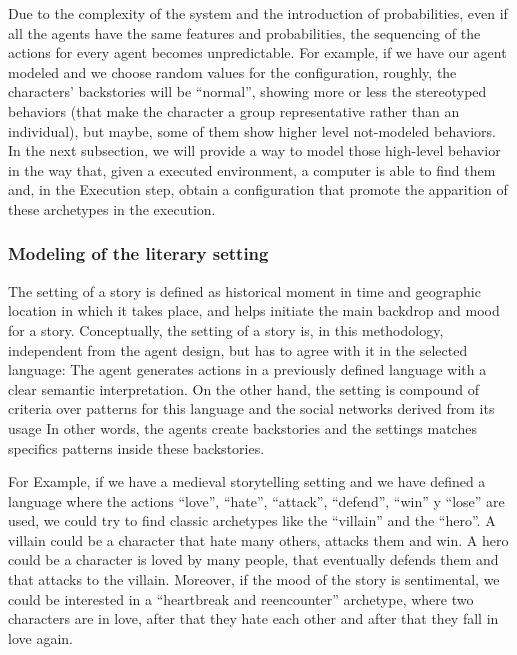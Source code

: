 \documentclass{sig-alternate}
\begin{document}
Due to the complexity of the system and the introduction of probabilities, even if all the agents have the same features and probabilities, the sequencing of the actions for every agent becomes unpredictable. For example, if we have our agent modeled and we choose random values for the configuration, roughly, the characters' backstories will be ``normal'', showing more or less the stereotyped behaviors (that make the character a group representative rather than an individual), but maybe, some of them show higher level not-modeled behaviors. In the next subsection, we will provide a way to model those high-level behavior in the way that, given a executed environment, a computer is able to find them 
and, in the Execution step, obtain a configuration that promote the apparition of these archetypes in the execution.

\subsubsection{Modeling of the literary setting}


The setting of a story is defined as historical moment in time and geographic location in which it takes place, and helps initiate the main backdrop and mood for a story.
Conceptually, the setting of a story is, in this methodology, independent from the agent design, but has to agree with it in the selected language: 
The agent generates actions in a previously defined language with a clear semantic interpretation. On the other hand, the setting is compound of criteria over patterns for this language and the social networks derived from its usage In other words, the agents create backstories and the settings matches specifics patterns inside these backstories.

For Example, if we have a medieval storytelling setting and we have defined a language where the actions ``love'', ``hate'', ``attack'', ``defend'', ``win'' y ``lose'' are used, we could try to find classic 
archetypes like the ``villain'' and the ``hero''. A villain could be a character that hate many others, attacks them and win. A hero could be a character is loved by many people, that eventually defends them and that attacks to the villain. Moreover, if the mood of the story is sentimental, we could be interested in a ``heartbreak and reencounter'' archetype, where two characters are in love, after that they hate each other and after that they fall in love again.
\end{document}
